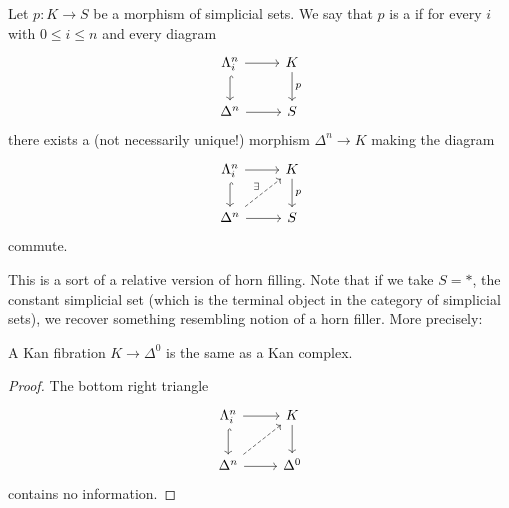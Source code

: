 \documentclass[main.tex]{subfiles}
\begin{document}
\begin{definition}
  \label{def:kan_fibration}
  Let $p\colon K \to S$ be a morphism of simplicial sets. We say that $p$ is a  if for every $i$ with $0 \leq i \leq n$ and every diagram
  \begin{equation*}
    \begin{tikzcd}
      \Lambda^{n}_{i}
      \arrow[r]
      \arrow[d, hookrightarrow]
      & K
      \arrow[d, "p"]
      \\
      \Delta^{n}
      \arrow[r]
      & S
    \end{tikzcd}
  \end{equation*}
  there exists a (not necessarily unique!) morphism $\Delta^{n} \to K$ making the diagram
  \begin{equation*}
    \begin{tikzcd}
      \Lambda^{n}_{i}
      \arrow[r]
      \arrow[d, hookrightarrow]
      & K
      \arrow[d, "p"]
      \\
      \Delta^{n}
      \arrow[ur, dashed, "\exists"]
      \arrow[r]
      & S
    \end{tikzcd}
  \end{equation*}
  commute.
\end{definition}

This is a sort of a relative version of horn filling. Note that if we take $S = *$, the constant simplicial set (which is the terminal object in the category of simplicial sets), we recover something resembling notion of a horn filler. More precisely:

\begin{corollary}
  \label{cor:kan_fibration_to_point_is_kan_complex}
  A Kan fibration $K \to \Delta^{0}$ is the same as a Kan complex.
\end{corollary}
\begin{proof}
  The bottom right triangle
  \begin{equation*}
    \begin{tikzcd}
      \Lambda^{n}_{i}
      \arrow[r]
      \arrow[d, hookrightarrow]
      & K
      \arrow[d]
      \\
      \Delta^{n}
      \arrow[ur, dashed]
      \arrow[r]
      & \Delta^{0}
    \end{tikzcd}
  \end{equation*}
  contains no information.
\end{proof}
\end{document}

